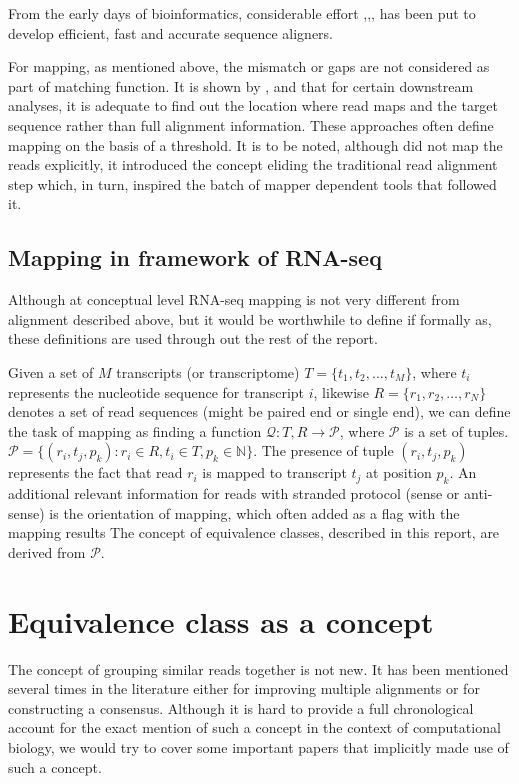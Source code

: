 From the early days of bioinformatics, considerable effort \citep{Smith1981},\citep{Langmead2010},\citep{Li2008},\citep{Li2009}  has been put to develop efficient, fast and accurate sequence aligners.  

For mapping, as mentioned above, the mismatch or gaps are not considered as part of matching function. It is shown by \citet{salmon}, \citet{kallisto} and \citet{rapmap} that for certain downstream analyses, it is adequate to find out the location where read maps and the target sequence rather than full alignment information. These approaches often define mapping on the basis of a threshold. It is to be noted, although \citet{sailfish} did not map the reads explicitly, it introduced the concept eliding the traditional read alignment step which, in turn, inspired the batch of mapper dependent tools that followed it.

\subsection{Mapping in framework of RNA-seq}
Although at conceptual level RNA-seq mapping is not very different from alignment described above, but it would be worthwhile to define if formally as, these definitions are used through out the rest of the report.

Given a set of $M$ transcripts (or transcriptome) $T = \{t_1,t_2,\ldots,t_M\}$, where $t_i$ represents the nucleotide sequence for transcript $i$, likewise  $R = \{r_1,r_2,\ldots,r_N\}$ denotes a set of read sequences (might be paired end or single end), we can define the task of mapping as finding a function $\mathcal{Q} : {T,R} \rightarrow \mathcal{P}$, where $\mathcal{P}$ is a set of tuples. $\mathcal{P} = \{(r_i,t_j,p_k) : r_i \in R, t_i \in T, p_k \in \mathbb{N}\}$. The presence of tuple $(r_i,t_j,p_k)$ represents the fact that read $r_i$ is mapped to transcript $t_j$ at position $p_k$. An additional relevant information for reads with stranded protocol (sense or anti-sense) is the orientation of mapping, which often added as a flag with the mapping results
The concept of equivalence classes, described in this report, are derived from $\mathcal{P}$.  

\section{Equivalence class as a concept}

The concept of grouping similar reads together is not new. It has been mentioned several times in the literature either for improving multiple alignments or for constructing a consensus. Although it is hard to provide a full chronological account for the exact mention of such a concept in the context of computational biology, we would try to cover some important papers that implicitly made use of such a concept. 

